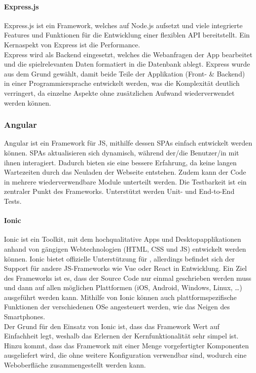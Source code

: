 \paragraph{Express.js} \label{tec:expressjs}
Express.js ist ein Framework, welches auf Node.js aufsetzt und viele integrierte Features und Funktionen für die Entwicklung einer flexiblen \ac{API} bereitstellt. Ein Kernaspekt von Express ist die Performance. \cite{express:2019} \\ 
Express wird als Backend eingesetzt, welches die Webanfragen der App bearbeitet und die spielrelevanten Daten formatiert in die Datenbank ablegt. Express wurde aus dem Grund gewählt, damit beide Teile der Applikation (Front- \& Backend) in einer Programmiersprache entwickelt werden, was die Komplexität deutlich verringert, da einzelne Aspekte ohne zusätzlichen Aufwand wiederverwendet werden können.

\subsubsection{Angular} \label{tec:angular}
Angular ist ein Framework für \ac{JS}, mithilfe dessen \ac{SPAs} einfach entwickelt werden können. \ac{SPAs} aktualisieren sich dynamisch, während der/die Benutzer/in mit ihnen interagiert. Dadurch bieten sie eine bessere Erfahrung, da keine langen Wartezeiten durch das Neuladen der Webseite entstehen. Zudem kann der Code in mehrere wiederverwendbare Module unterteilt werden. Die Testbarkeit ist ein zentraler Punkt des Frameworks. Unterstützt werden Unit- und End-to-End Tests. \cite{goel:angular:2019}\cite{krukowski:angular:2019} 

\paragraph{Ionic} \label{tec:ionic}
Ionic ist ein Toolkit, mit dem hochqualitative Apps und Desktopapplikationen anhand von gängigen Webtechnologien (\ac{HTML}, \ac{CSS} und \ac{JS}) entwickelt werden können. Ionic bietet offizielle Unterstützung für , allerdings befindet sich der Support für andere \acl{JS}-Frameworks wie Vue oder React in Entwicklung. Ein Ziel des Frameworks ist es, dass der Source Code nur einmal geschrieben werden muss und dann auf allen möglichen Plattformen (iOS, Android, Windows, Linux, \dots) ausgeführt werden kann. Mithilfe von Ionic können auch plattformspezifische Funktionen der verschiedenen \acl{OS}e angesteuert werden, wie das Neigen des Smartphones. \cite{ionic:2019} \\
Der Grund für den Einsatz von Ionic ist, dass das Framework Wert auf Einfachheit legt, weshalb das Erlernen der Kernfunktionalität sehr simpel ist. Hinzu kommt, dass das Framework mit einer Menge vorgefertigter Komponenten ausgeliefert wird, die ohne weitere Konfiguration verwendbar sind, wodurch eine Weboberfläche zusammengestellt werden kann. 

